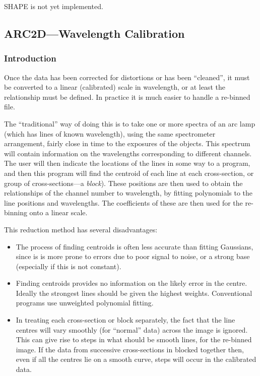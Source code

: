 \documentclass[11pt,twoside]{article}
\newcommand{\xlabel}[1]{}
\begin{document}
SHAPE is not yet implemented.

\subsection{\xlabel{arc2dwavelength_calibration}\label{arc2dwavelength_calibration}ARC2D---Wavelength Calibration}
\label{sc.arc2d}

\subsubsection{\xlabel{arc2d_introduction}Introduction}

Once the data has been corrected for distortions or has been
``cleaned'', it must be converted to a linear (calibrated) scale in
wavelength, or at least the relationship must be defined.
In practice it is much easier to handle a re-binned file.

The ``traditional'' way of doing this is to take one or more spectra
of an arc lamp (which has lines of known wavelength), using the same
spectrometer arrangement, fairly close in time to the exposures of the
objects. This spectrum will contain information on the wavelengths
corresponding to different channels. The user will then indicate the
locations of the lines in some way to a program, and then this program
will find the centroid of each line at each cross-section, or group of
cross-sections---a {\em block}). These positions are then used to obtain
the relationships of the channel number to wavelength, by fitting
polynomials to the line positions and wavelengths. The coefficients of
these are then used for the re-binning onto a linear scale.

This reduction method has several disadvantages:
\begin{itemize}
\item The process of finding centroids is often less accurate than
fitting Gaussians, since is is more prone to errors due to poor signal
to noise, or a strong base (especially if this is not constant).
\item Finding centroids provides no information on the likely error
in the centre. Ideally the strongest lines should be given the highest
weights. Conventional programs use unweighted polynomial fitting.
\item In treating each cross-section or block separately, the fact that
the line centres will vary smoothly (for ``normal'' data) across the
image is ignored. This can give rise to steps in what should be smooth
lines, for the re-binned image. If the data from successive
cross-sections in blocked together then, even if all the centres lie on
a smooth curve, steps will occur in the calibrated data.
\end{itemize}
\end{document}
